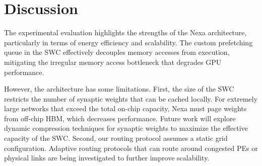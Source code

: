 \section{Discussion}
The experimental evaluation highlights the strengths of the Nexa architecture, particularly in terms of energy efficiency and scalability. The custom prefetching queue in the SWC effectively decouples memory accesses from execution, mitigating the irregular memory access bottleneck that degrades GPU performance.

However, the architecture has some limitations. First, the size of the SWC restricts the number of synaptic weights that can be cached locally. For extremely large networks that exceed the total on-chip capacity, Nexa must page weights from off-chip HBM, which decreases performance. Future work will explore dynamic compression techniques for synaptic weights to maximize the effective capacity of the SWC. Second, our routing protocol assumes a static grid configuration. Adaptive routing protocols that can route around congested PEs or physical links are being investigated to further improve scalability.
